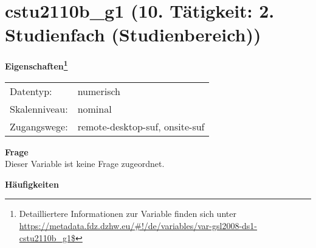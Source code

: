 
    \setcounter{footnote}{0}

    \vspace*{-1.8cm}
	\section{cstu2110b\_g1 (10. Tätigkeit: 2. Studienfach (Studienbereich))}
	\label{section:cstu2110b_g1}



    \vspace*{0.5cm}
    \noindent\textbf{Eigenschaften\footnote{Detailliertere Informationen zur Variable finden sich unter
		\url{https://metadata.fdz.dzhw.eu/\#!/de/variables/var-gsl2008-ds1-cstu2110b_g1$}}}\\
	\begin{tabularx}{\hsize}{@{}lX}
	Datentyp: & numerisch \\
	Skalenniveau: & nominal \\
	Zugangswege: &
	  remote-desktop-suf, 
	  onsite-suf
 \\
    \end{tabularx}



		\vspace*{0.5cm}
		\noindent\textbf{Frage}\\
		Dieser Variable ist keine Frage zugeordnet.





        		\vspace*{0.5cm}
                \noindent\textbf{Häufigkeiten}

